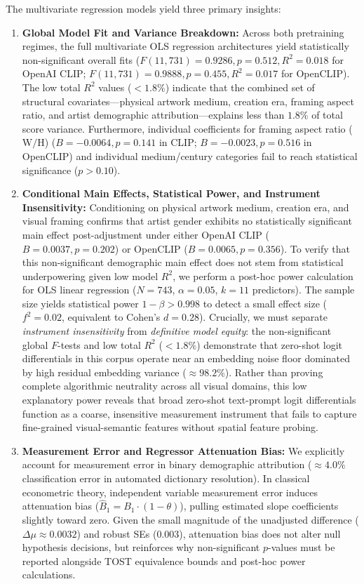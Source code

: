 \documentclass[pdflatex,sn-mathphys-num]{sn-jnl}%
\theoremstyle{thmstyleone}%
\theoremstyle{thmstyletwo}%
\theoremstyle{thmstylethree}%
\begin{document}
The multivariate regression models yield three primary insights:
\begin{enumerate}
    \item \textbf{Global Model Fit and Variance Breakdown:} Across both pretraining regimes, the full multivariate OLS regression architectures yield statistically non-significant overall fits ($F(11, 731) = 0.9286, p = 0.512, R^2 = 0.018$ for OpenAI CLIP; $F(11, 731) = 0.9888, p = 0.455, R^2 = 0.017$ for OpenCLIP). The low total $R^2$ values ($<1.8\%$) indicate that the combined set of structural covariates—physical artwork medium, creation era, framing aspect ratio, and artist demographic attribution—explains less than $1.8\%$ of total score variance. Furthermore, individual coefficients for framing aspect ratio ($\text{W}/\text{H}$) ($B = -0.0064, p = 0.141$ in CLIP; $B = -0.0023, p = 0.516$ in OpenCLIP) and individual medium/century categories fail to reach statistical significance ($p > 0.10$).
    \item \textbf{Conditional Main Effects, Statistical Power, and Instrument Insensitivity:} Conditioning on physical artwork medium, creation era, and visual framing confirms that artist gender exhibits no statistically significant main effect post-adjustment under either OpenAI CLIP ($B = 0.0037, p = 0.202$) or OpenCLIP ($B = 0.0065, p = 0.356$). To verify that this non-significant demographic main effect does not stem from statistical underpowering given low model $R^2$, we perform a post-hoc power calculation for OLS linear regression ($N=743$, $\alpha=0.05$, $k=11$ predictors). The sample size yields statistical power $1-\beta > 0.998$ to detect a small effect size ($f^2 = 0.02$, equivalent to Cohen's $d = 0.28$). Crucially, we must separate \textit{instrument insensitivity} from \textit{definitive model equity}: the non-significant global $F$-tests and low total $R^2$ ($<1.8\%$) demonstrate that zero-shot logit differentials in this corpus operate near an embedding noise floor dominated by high residual embedding variance ($\approx 98.2\%$). Rather than proving complete algorithmic neutrality across all visual domains, this low explanatory power reveals that broad zero-shot text-prompt logit differentials function as a coarse, insensitive measurement instrument that fails to capture fine-grained visual-semantic features without spatial feature probing.
    \item \textbf{Measurement Error and Regressor Attenuation Bias:} We explicitly account for measurement error in binary demographic attribution ($\approx 4.0\%$ classification error in automated dictionary resolution). In classical econometric theory, independent variable measurement error induces attenuation bias ($\hat{B}_1 = B_1 \cdot (1 - \theta)$), pulling estimated slope coefficients slightly toward zero. Given the small magnitude of the unadjusted difference ($\Delta \mu \approx 0.0032$) and robust SEs ($0.003$), attenuation bias does not alter null hypothesis decisions, but reinforces why non-significant $p$-values must be reported alongside TOST equivalence bounds and post-hoc power calculations.
\end{enumerate}
\end{document}
